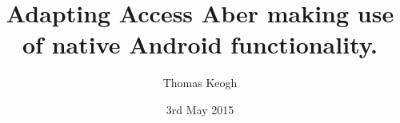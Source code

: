 
\title{Adapting Access Aber making use of native
Android functionality.}

\author{Thomas Keogh}




\date{3rd May 2015} %




\maketitle



